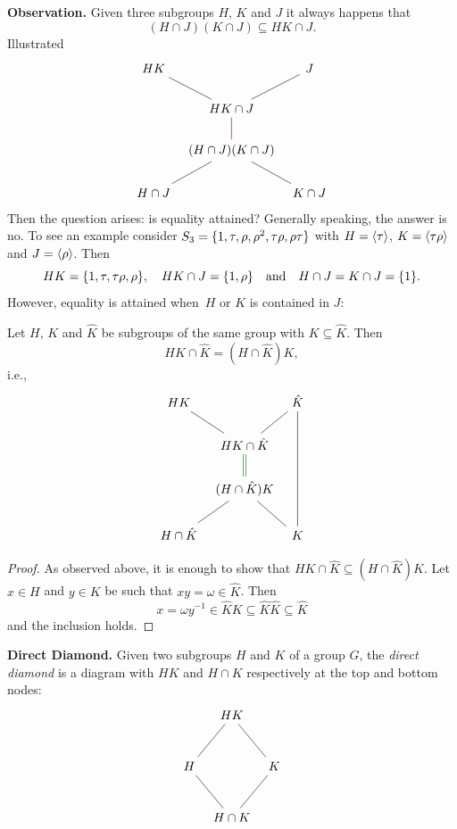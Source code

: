 \medskip


\textbf{Observation.} Given three subgroups $H$, $K$ and $J$ it always happens that
$$
    (H\cap J)(K\cap J)\subseteq HK\cap J.
$$
Illustrated
$$
    \begin{tikzcd}[column sep=tiny]
        HK\arrow[rd, no head]&&J\arrow[ld, no head]\\
        & HK\cap J\\
        & (H\cap J)(K\cap J)\arrow[u, no head, black!60!red]\\
        H\cap J\arrow[ru, no head]&& K\cap J \arrow[lu, no head]
    \end{tikzcd}
$$
Then the question arises: is equality attained? Generally speaking, the answer is no. To see an example consider $S_3=\{1, \tau, \rho, \rho^2, \tau\rho,\rho\tau\}$ with $H=\langle\tau\rangle$, $K=\langle\tau\rho\rangle$ and $J=\langle\rho\rangle$. Then
$$
    HK = \{1,\tau,\tau\rho,\rho\},\quad HK\cap J=\{1,\rho\}
        \quad\textrm{and}\quad H\cap J=K\cap J=\{1\}.
$$
However, equality is attained when~$H$ or $K$ is contained in $J$:

\begin{prop}{\upshape[Dedekind]}\label{dedekind}
    Let $H$, $K$ and $\hat K$ be subgroups of the same group with $K\subseteq \hat K$. Then
    $$
        HK\cap \hat K= (H\cap \hat K)K,
    $$
    i.e.,
    $$
        \begin{tikzcd}[column sep=tiny]
            HK\arrow[rd, no head]&&\hat K\arrow[ld, no head]\\
            & HK\cap \hat K\\
            & (H\cap \hat K)K\arrow[u, no head, equal, black!60!green]\\
            H\cap \hat K\arrow[ru, no head] && K \arrow[lu, no head]\arrow[uuu, no head]
        \end{tikzcd}
    $$
\end{prop}

\begin{proof} As observed above, it is enough to show that $HK\cap \hat K\subseteq (H\cap \hat K)K$. Let $x\in H$ and $y\in K$ be such that $xy=\omega\in \hat K$. Then
$$
    x=\omega y^{-1}\in \hat KK\subseteq \hat K\hat K\subseteq \hat K
$$
and the inclusion holds. \end{proof}

\medskip

\textbf{Direct Diamond.} Given two subgroups $H$ and $K$ of a group $G$, the \textsl{direct diamond} is a diagram with $HK$ and $H\cap K$ respectively at the top and bottom nodes:
$$
\begin{tikzcd}[column sep=tiny, row sep=large]
    &HK \arrow[ld, no head] \arrow[rd, no head]\\
    H\arrow[rd, no head]&&K \arrow[ld, no head]\\
    &H\cap K                 
\end{tikzcd}
$$


